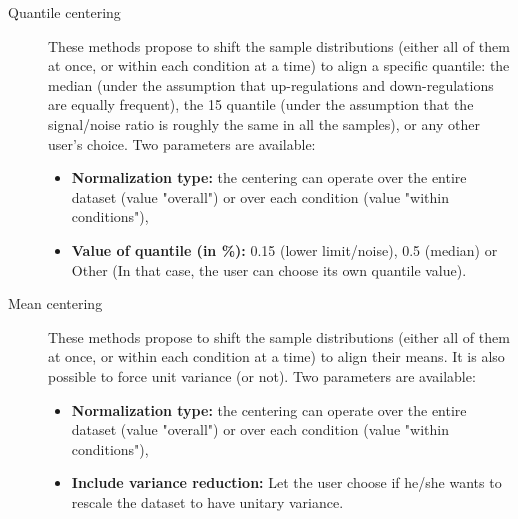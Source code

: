 \documentclass[12pt]{article}
\begin{document}
{\begin {description}
\item[Quantile centering]
These methods propose to shift the sample distributions (either all of them at 
once, or within each condition at a time) to align a specific quantile: the 
median (under the assumption that up-regulations and down-regulations are 
equally frequent), the 15 quantile (under the assumption that the signal/noise 
ratio is roughly the same in all the samples), or any other user's choice. 
Two parameters are available:
\begin{itemize}
\item \textbf{Normalization type: } the centering can operate over the entire 
dataset (value "overall") or over each condition (value "within conditions"),
\item \textbf{Value of quantile (in \%): } 0.15 (lower limit/noise), 
0.5 (median) or Other (In that case, the user can choose its own quantile 
value).\newline
\end{itemize}


\item[Mean centering]
These methods propose to shift the sample distributions (either all of them at 
once, or within each condition at a time) to align their means. It is also 
possible to force unit variance (or not). Two parameters are available:
\begin{itemize}
\item \textbf{Normalization type:} the centering can operate over the entire 
dataset (value "overall") or over each condition (value "within conditions"),
\item \textbf{Include variance reduction:} Let the user choose if he/she wants 
to rescale the dataset to have unitary variance.
\end{itemize}


\end{description}}
\end{document}
